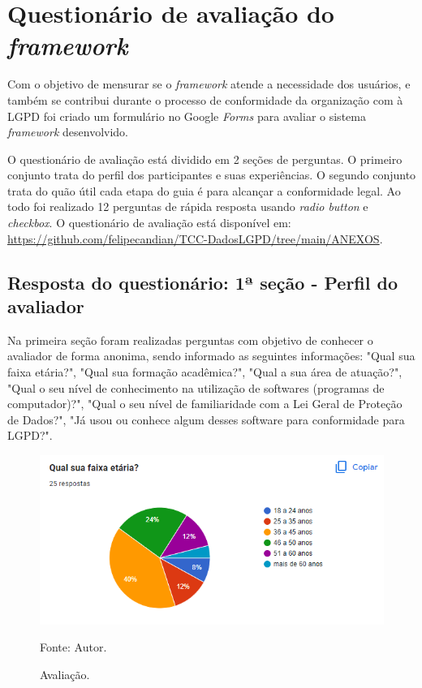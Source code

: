 \documentclass[
	12pt,				%
	openright,			%
	oneside,			%
	a4paper,			%
	english,			%
	french,				%
	spanish,			%
	brazil,				%
	]{abntex2}
\begin{document}
\section{Questionário de avaliação do \textit{framework} }
Com o objetivo de mensurar se o \textit{framework} atende a necessidade dos usuários, e também se contribui durante o processo de conformidade da organização com à LGPD foi criado um formulário no Google \textit{Forms} para avaliar o sistema \textit{framework} desenvolvido. 

O questionário de avaliação está dividido em 2 seções de perguntas. O primeiro conjunto trata do perfil dos participantes e suas experiências. O segundo conjunto trata do quão útil cada etapa do guia é para alcançar a conformidade legal. Ao todo foi realizado 12 perguntas de rápida resposta usando \textit{radio button} e \textit{checkbox}.  O questionário de avaliação está disponível em: \url{https://github.com/felipecandian/TCC-DadosLGPD/tree/main/ANEXOS}.
 
 \subsection{Resposta do questionário: 1ª seção - Perfil do avaliador}
 Na primeira seção foram realizadas perguntas com objetivo de conhecer o avaliador de forma anonima, sendo informado as seguintes informações: "Qual sua faixa etária?", "Qual sua formação acadêmica?", "Qual a sua área de atuação?", "Qual o seu nível de conhecimento na utilização de softwares (programas de computador)?", "Qual o seu nível de familiaridade com a Lei Geral de Proteção de Dados?", "Já usou ou conhece algum desses software para conformidade para LGPD?".

 
\label{sec: resultados}

\begin{figure}[ht]
    \centering
    \caption{Avaliação.}
    \includegraphics[width=5.0in]{Images/questionario/1.png}
    \label{fig: grafico-acc}
    
    \centering \small Fonte: Autor.
\end{figure}
\end{document}
